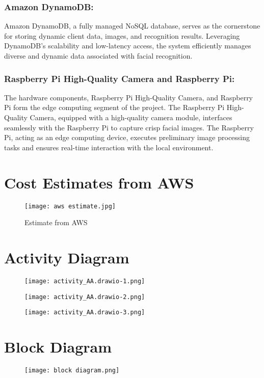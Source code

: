 \documentclass[11pt]{article}
\begin{document}
\subsubsection{Amazon DynamoDB:}
Amazon DynamoDB, a fully managed NoSQL database, serves as the cornerstone for storing dynamic client data, images, and recognition results. Leveraging DynamoDB's scalability and low-latency access, the system efficiently manages diverse and dynamic data associated with facial recognition.

\subsubsection{Raspberry Pi High-Quality Camera and Raspberry Pi:}
The hardware components, Raspberry Pi High-Quality Camera, and Raspberry Pi form the edge computing segment of the project. The Raspberry Pi High-Quality Camera, equipped with a high-quality camera module, interfaces seamlessly with the Raspberry Pi to capture crisp facial images. The Raspberry Pi, acting as an edge computing device, executes preliminary image processing tasks and ensures real-time interaction with the local environment.

\section{Cost Estimates from AWS}

\begin{figure}[H]
    \centering
    \texttt{[image: aws estimate.jpg]}
    \caption{Estimate from AWS}
\end{figure}

\section{Activity Diagram}
\begin{figure}[H]
    \centering
    \texttt{[image: activity\_AA.drawio-1.png]}
\end{figure}
\begin{figure}[H]
    \centering
    \texttt{[image: activity\_AA.drawio-2.png]}
\end{figure}
\begin{figure}[H]
    \centering
    \texttt{[image: activity\_AA.drawio-3.png]}
\end{figure}

\section{Block Diagram}
\begin{figure}[H]
    \centering
    \texttt{[image: block diagram.png]}
\end{figure}
\end{document}

